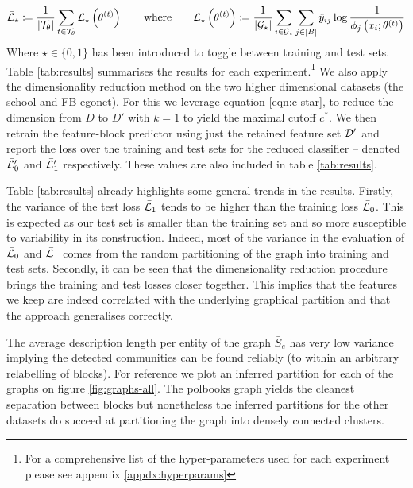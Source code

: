 %
\begin{equation}
	\bar{\mathcal{L}}_\star \coloneqq \frac{1}{|\mathcal{T}_\theta|} \sum_{t \in \mathcal{T}_\theta} \mathcal{L}_\star \left( \theta^{(t)} \right)
	\qquad \textrm{where} \qquad
	\mathcal{L}_\star \left( \theta^{(t)} \right) \coloneqq \frac{1}{|\mathcal{G}_\star|} \sum_{i \in \mathcal{G}_\star}\sum_{j \in [B]} \hat{y}_{ij} \log \frac{1}{\phi_j \left(x_i; \theta^{(t)} \right)}
	\label{eqn:cross-entropy-loss}
\end{equation}
%
Where $\star \in \{0, 1\}$ has been introduced to toggle between training and test sets. Table \ref{tab:results} summarises the results for each experiment.\footnote{For a comprehensive list of the hyper-parameters used for each experiment please see appendix \ref{appdx:hyperparams}} We also apply the dimensionality reduction method on the two higher dimensional datasets (the school and FB egonet). For this we leverage equation \ref{eqn:c-star}, to reduce the dimension from $D$ to $D'$ with $k=1$ to yield the maximal cutoff $c^*$. We then retrain the feature-block predictor using just the retained feature set $\mathcal{D}'$ and report the loss over the training and test sets for the reduced classifier -- denoted $\bar{\mathcal{L}}_0'$ and $\bar{\mathcal{L}}_1'$ respectively. These values are also included in table \ref{tab:results}.

Table \ref{tab:results} already highlights some general trends in the results. Firstly, the variance of the test loss $\bar{\mathcal{L}}_1$ tends to be higher than the training loss $\bar{\mathcal{L}}_0$. This is expected as our test set is smaller than the training set and so more susceptible to variability in its construction. Indeed, most of the variance in the evaluation of $\bar{\mathcal{L}}_0$ and $\bar{\mathcal{L}}_1$ comes from the random partitioning of the graph into training and test sets. Secondly, it can be seen that the dimensionality reduction procedure brings the training and test losses closer together. This implies that the features we keep are indeed correlated with the underlying graphical partition and that the approach generalises correctly.

The average description length per entity of the graph $\bar{S}_e$ has very low variance implying the detected communities can be found reliably (to within an arbitrary relabelling of blocks). For reference we plot an inferred partition for each of the graphs on figure \ref{fig:graphs-all}. The polbooks graph yields the cleanest separation between blocks but nonetheless the inferred partitions for the other datasets do succeed at partitioning the graph into densely connected clusters.

